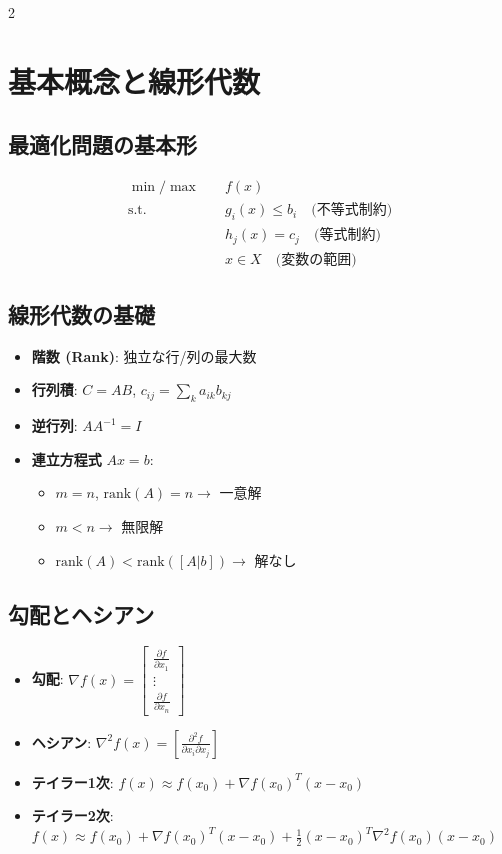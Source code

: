 \documentclass[10pt,a4paper,landscape]{article}
\begin{document}
\begin{multicols}{2}

\section*{基本概念と線形代数}

\subsection*{最適化問題の基本形}
\begin{align}
\min/\max \quad & f(x) \\
\text{s.t.} \quad & g_i(x) \leq b_i \quad \text{(不等式制約)} \\
& h_j(x) = c_j \quad \text{(等式制約)} \\
& x \in X \quad \text{(変数の範囲)}
\end{align}

\subsection*{線形代数の基礎}
\begin{itemize}
\item \textbf{階数 (Rank)}: 独立な行/列の最大数
\item \textbf{行列積}: $C = AB$, $c_{ij} = \sum_k a_{ik}b_{kj}$
\item \textbf{逆行列}: $AA^{-1} = I$
\item \textbf{連立方程式} $Ax = b$:
  \begin{itemize}
  \item $m = n$, $\text{rank}(A) = n \rightarrow$ 一意解
  \item $m < n \rightarrow$ 無限解
  \item $\text{rank}(A) < \text{rank}([A|b]) \rightarrow$ 解なし
  \end{itemize}
\end{itemize}

\subsection*{勾配とヘシアン}
\begin{itemize}
\item \textbf{勾配}: $\nabla f(x) = \begin{bmatrix} \frac{\partial f}{\partial x_1} \\ \vdots \\ \frac{\partial f}{\partial x_n} \end{bmatrix}$
\item \textbf{ヘシアン}: $\nabla^2 f(x) = \left[\frac{\partial^2 f}{\partial x_i \partial x_j}\right]$
\item \textbf{テイラー1次}: $f(x) \approx f(x_0) + \nabla f(x_0)^T(x - x_0)$
\item \textbf{テイラー2次}: $f(x) \approx f(x_0) + \nabla f(x_0)^T(x - x_0) + \frac{1}{2}(x - x_0)^T\nabla^2 f(x_0)(x - x_0)$
\end{itemize}


\end{multicols}
\end{document}
